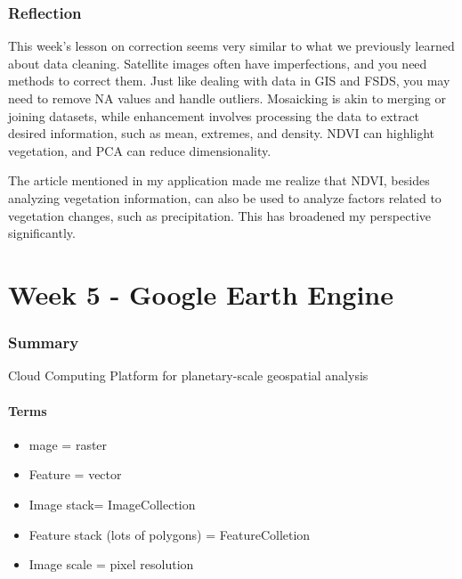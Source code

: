 \documentclass[
  letterpaper,
  DIV=11,
  numbers=noendperiod]{scrreprt}
\providecommand{\tightlist}{%
  \setlength{\itemsep}{0pt}\setlength{\parskip}{0pt}}\usepackage{longtable,booktabs,array}
\begin{document}
\hypertarget{reflection-1}{%
\subsection{Reflection}\label{reflection-1}}

This week's lesson on correction seems very similar to what we
previously learned about data cleaning. Satellite images often have
imperfections, and you need methods to correct them. Just like dealing
with data in GIS and FSDS, you may need to remove NA values and handle
outliers. Mosaicking is akin to merging or joining datasets, while
enhancement involves processing the data to extract desired information,
such as mean, extremes, and density. NDVI can highlight vegetation, and
PCA can reduce dimensionality.

The article mentioned in my application made me realize that NDVI,
besides analyzing vegetation information, can also be used to analyze
factors related to vegetation changes, such as precipitation. This has
broadened my perspective significantly.


\hypertarget{week-5---google-earth-engine}{%
\chapter{Week 5 - Google Earth
Engine}\label{week-5---google-earth-engine}}

\hypertarget{summary-2}{%
\subsection{Summary}\label{summary-2}}

Cloud Computing Platform for planetary-scale geospatial analysis

\hypertarget{terms}{%
\subsubsection{Terms}\label{terms}}

\begin{itemize}
\tightlist
\item
  mage = raster
\item
  Feature = vector
\item
  Image stack= ImageCollection
\item
  Feature stack (lots of polygons) = FeatureColletion
\item
  Image scale = pixel resolution
\end{itemize}
\end{document}
